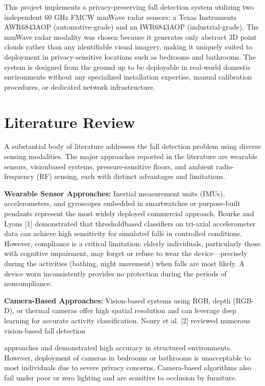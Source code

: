This project implements a privacy-preserving fall detection system utilizing two independent 60 GHz FMCW mmWave radar sensors: a Texas Instruments AWR6843AOP (automotive-grade) and an IWR6843AOP (industrial-grade). The mmWave radar modality was chosen because it generates only abstract 3D point clouds rather than any identifiable visual imagery, making it uniquely suited to deployment in privacy-sensitive locations such as bedrooms and bathrooms. The system is designed from the ground up to be deployable in real-world domestic environments without any specialized installation expertise, manual calibration procedures, or dedicated network infrastructure. 

\section{Literature Review}

A substantial body of literature addresses the fall detection problem using diverse sensing modalities. The major approaches reported in the literature are wearable sensors, visionbased systems, pressure-sensitive floors, and ambient radio-frequency (RF) sensing, each with distinct advantages and limitations. 

\textbf{Wearable Sensor Approaches:} Inertial measurement units (IMUs), accelerometers, and gyroscopes embedded in smartwatches or purpose-built pendants represent the most widely deployed commercial approach. Bourke and Lyons [1] demonstrated that thresholdbased classifiers on tri-axial accelerometer data can achieve high sensitivity for simulated falls in controlled conditions. However, compliance is a critical limitation: elderly individuals, particularly those with cognitive impairment, may forget or refuse to wear the device---precisely during the activities (bathing, night movement) when falls are most likely. A device worn inconsistently provides no protection during the periods of noncompliance. 

\textbf{Camera-Based Approaches:} Vision-based systems using RGB, depth (RGB-D), or thermal cameras offer high spatial resolution and can leverage deep learning for accurate activity classification. Noury et al. [2] reviewed numerous vision-based fall detection 


approaches and demonstrated high accuracy in structured environments. However, deployment of cameras in bedrooms or bathrooms is unacceptable to most individuals due to severe privacy concerns. Camera-based algorithms also fail under poor or zero lighting and are sensitive to occlusion by furniture. 

